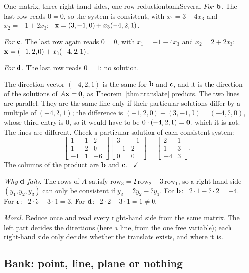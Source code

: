 \documentclass[11pt]{article}
\begin{document}
\begin{exmp}{One matrix, three right-hand sides, one row reduction}{bankSeveral}
\emph{For $\mathbf{b}$.} The last row reads $0=0$, so the system is consistent, with $x_1=3-4x_3$ and $x_2=-1+2x_3$: \ $\mathbf{x}=(3,-1,0)+x_3(-4,2,1)$.

\emph{For $\mathbf{c}$.} The last row again reads $0=0$, with $x_1=-1-4x_3$ and $x_2=2+2x_3$: \ $\mathbf{x}=(-1,2,0)+x_3(-4,2,1)$.

\emph{For $\mathbf{d}$.} The last row reads $0=1$: no solution.

The direction vector $(-4,2,1)$ is the same for $\mathbf{b}$ and $\mathbf{c}$, and it is the direction of the solutions of $A\mathbf{x}=\mathbf{0}$, as Theorem~\ref{thm:translate} predicts. The two lines are parallel. They are the same line only if their particular solutions differ by a multiple of $(-4,2,1)$; the difference is $(-1,2,0)-(3,-1,0)=(-4,3,0)$, whose third entry is $0$, so it would have to be $0\cdot(-4,2,1)=\mathbf{0}$, which it is not. The lines are different. Check a particular solution of each consistent system:
\[
\begin{bmatrix}1&1&2\\1&2&0\\-1&1&-6\end{bmatrix}\begin{bmatrix}3&-1\\-1&2\\0&0\end{bmatrix}=\begin{bmatrix}2&1\\1&3\\-4&3\end{bmatrix}.
\]
The columns of the product are $\mathbf{b}$ and $\mathbf{c}$. \ $\checkmark$

\emph{Why $\mathbf{d}$ fails.} The rows of $A$ satisfy $\text{row}_3=2\,\text{row}_2-3\,\text{row}_1$, so a right-hand side $(y_1,y_2,y_3)$ can only be consistent if $y_3=2y_2-3y_1$. For $\mathbf{b}$: \ $2\cdot1-3\cdot2=-4$. For $\mathbf{c}$: \ $2\cdot3-3\cdot1=3$. For $\mathbf{d}$: \ $2\cdot2-3\cdot1=1\neq0$.

\emph{Moral.} Reduce once and read every right-hand side from the same matrix. The left part decides the directions (here a line, from the one free variable); each right-hand side only decides whether the translate exists, and where it is.
\end{exmp}

\subsection*{Bank: point, line, plane or nothing}
\end{document}
